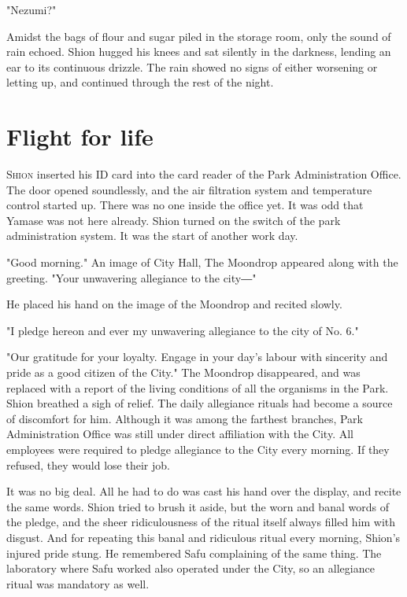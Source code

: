 "Nezumi?"

Amidst the bags of flour and sugar piled in the storage room, only the
sound of rain echoed. Shion hugged his knees and sat silently in the
darkness, lending an ear to its continuous drizzle. The rain showed no
signs of either worsening or letting up, and continued through the rest
of the night.

\chapter{Flight for life}

\lettrine{S}{hion} inserted his ID card into the card reader of the Park
Administration Office. The door opened soundlessly, and the air
filtration system and temperature control started up. There was no one
inside the office yet. It was odd that Yamase was not here already.
Shion turned on the switch of the park administration system. It was the
start of another work day.

"Good morning." An image of City Hall, The Moondrop appeared along with
the greeting. "Your unwavering allegiance to the city―"

He placed his hand on the image of the Moondrop and recited slowly.

"I pledge hereon and ever my unwavering allegiance to the city of No.
6."

"Our gratitude for your loyalty. Engage in your day's labour with
sincerity and pride as a good citizen of the City." The Moondrop
disappeared, and was replaced with a report of the living conditions of
all the organisms in the Park. Shion breathed a sigh of relief. The
daily allegiance rituals had become a source of discomfort for him.
Although it was among the farthest branches, Park Administration Office
was still under direct affiliation with the City. All employees were
required to pledge allegiance to the City every morning. If they
refused, they would lose their job.

It was no big deal. All he had to do was cast his hand over the display,
and recite the same words. Shion tried to brush it aside, but the worn
and banal words of the pledge, and the sheer ridiculousness of the
ritual itself always filled him with disgust. And for repeating this
banal and ridiculous ritual every morning, Shion's injured pride stung.
He remembered Safu complaining of the same thing. The laboratory where
Safu worked also operated under the City, so an allegiance ritual was
mandatory as well.

